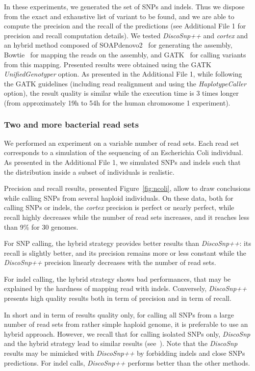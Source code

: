 \documentclass{bmcart}
\newcommand{\disco}{{\it DiscoSnp}\xspace}
\newcommand{\discopp}{{\it DiscoSnp++}\xspace}
\newcommand{\co}{{\it cortex}\xspace}
\begin{document}
In these experiments, we generated the set of SNPs and indels. Thus we dispose from the exact and exhaustive list of variant to be found, and we are able to compute the precision and the recall of the predictions (see Additional File 1 for precision and recall computation details). We tested \discopp and \co and an hybrid method composed of SOAPdenovo2~\cite{luo2012soapdenovo2} for generating the assembly, Bowtie~\cite{langmead2012fast} for mapping the reads on the assembly, and GATK~\cite{gatk} for calling variants from this mapping. Presented results were obtained using the GATK \emph{UnifiedGenotyper} option. As presented in the Additional File 1, while following the GATK guidelines (including read realignment and using the \emph{HaplotypeCaller} option), the result quality is similar while the execution time is 3 times longer (from approximately 19h to 54h for the human chromosome 1 experiment). 

\subsubsection*{Two and more bacterial read sets}
We performed an experiment on a variable number of read sets. Each read set corresponds to a simulation of the sequencing of an Escherichia Coli individual. As presented in the Additional File 1, we simulated SNPs and indels such that the distribution inside a subset of individuals is realistic. 

Precision and recall results, presented Figure~\ref{fig:ncoli}, allow to draw conclusions while calling SNPs from several haploid individuals. On these data, both for calling SNPs or indels, the \co precision is perfect or nearly perfect, while recall highly decreases while the number of read sets increases, and it reaches less than 9\% for 30 genomes. 

For SNP calling, the hybrid strategy provides better results than \discopp: its recall is slightly better, and its precision remains more or less constant while the \discopp precision linearly decreases with the number of read sets. 


For indel calling, the hybrid strategy shows bad performances, that may be explained by the hardness of mapping read with indels. Conversely, \discopp presents high quality results both in term of precision and in term of recall. 


In short and in term of results quality only, for calling all SNPs from a large number of read sets from rather simple haploid genome, it is preferable to use an hybrid approach. However, we recall that for calling isolated SNPs only, \disco and the hybrid strategy lead to similar results (see~\cite{Uricaru2014a}). Note that the \disco results may be mimicked with \discopp by forbidding indels and close SNPs predictions. For indel calls, \discopp performs better than the other methods.
\end{document}
